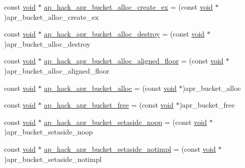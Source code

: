 \begin{DoxyCompactItemize}
\item 
const \hyperlink{group__MOD__ISAPI_gacd6cdbf73df3d9eed42fa493d9b621a6}{void} $\ast$ \hyperlink{srclib_2apr-util_2exports_8c_a69e308992cb68464b97ce9285201ee38}{ap\+\_\+hack\+\_\+apr\+\_\+bucket\+\_\+alloc\+\_\+create\+\_\+ex} = (const \hyperlink{group__MOD__ISAPI_gacd6cdbf73df3d9eed42fa493d9b621a6}{void} $\ast$)apr\+\_\+bucket\+\_\+alloc\+\_\+create\+\_\+ex
\item 
const \hyperlink{group__MOD__ISAPI_gacd6cdbf73df3d9eed42fa493d9b621a6}{void} $\ast$ \hyperlink{srclib_2apr-util_2exports_8c_a544c9332a888f895c9cc1ec7bc718bed}{ap\+\_\+hack\+\_\+apr\+\_\+bucket\+\_\+alloc\+\_\+destroy} = (const \hyperlink{group__MOD__ISAPI_gacd6cdbf73df3d9eed42fa493d9b621a6}{void} $\ast$)apr\+\_\+bucket\+\_\+alloc\+\_\+destroy
\item 
const \hyperlink{group__MOD__ISAPI_gacd6cdbf73df3d9eed42fa493d9b621a6}{void} $\ast$ \hyperlink{srclib_2apr-util_2exports_8c_acd429d9ecb922d0425db1d2fffc8ffc5}{ap\+\_\+hack\+\_\+apr\+\_\+bucket\+\_\+alloc\+\_\+aligned\+\_\+floor} = (const \hyperlink{group__MOD__ISAPI_gacd6cdbf73df3d9eed42fa493d9b621a6}{void} $\ast$)apr\+\_\+bucket\+\_\+alloc\+\_\+aligned\+\_\+floor
\item 
const \hyperlink{group__MOD__ISAPI_gacd6cdbf73df3d9eed42fa493d9b621a6}{void} $\ast$ \hyperlink{srclib_2apr-util_2exports_8c_a0c334b3bc658a01eeded4f403def51b2}{ap\+\_\+hack\+\_\+apr\+\_\+bucket\+\_\+alloc} = (const \hyperlink{group__MOD__ISAPI_gacd6cdbf73df3d9eed42fa493d9b621a6}{void} $\ast$)apr\+\_\+bucket\+\_\+alloc
\item 
const \hyperlink{group__MOD__ISAPI_gacd6cdbf73df3d9eed42fa493d9b621a6}{void} $\ast$ \hyperlink{srclib_2apr-util_2exports_8c_a3bc639753971d2f666713f626a48bfaa}{ap\+\_\+hack\+\_\+apr\+\_\+bucket\+\_\+free} = (const \hyperlink{group__MOD__ISAPI_gacd6cdbf73df3d9eed42fa493d9b621a6}{void} $\ast$)apr\+\_\+bucket\+\_\+free
\item 
const \hyperlink{group__MOD__ISAPI_gacd6cdbf73df3d9eed42fa493d9b621a6}{void} $\ast$ \hyperlink{srclib_2apr-util_2exports_8c_ac7ae8cbcc830ccb1b0250d5a30543dbf}{ap\+\_\+hack\+\_\+apr\+\_\+bucket\+\_\+setaside\+\_\+noop} = (const \hyperlink{group__MOD__ISAPI_gacd6cdbf73df3d9eed42fa493d9b621a6}{void} $\ast$)apr\+\_\+bucket\+\_\+setaside\+\_\+noop
\item 
const \hyperlink{group__MOD__ISAPI_gacd6cdbf73df3d9eed42fa493d9b621a6}{void} $\ast$ \hyperlink{srclib_2apr-util_2exports_8c_ade8f7f5f070cd494f1c3b50bbe5af330}{ap\+\_\+hack\+\_\+apr\+\_\+bucket\+\_\+setaside\+\_\+notimpl} = (const \hyperlink{group__MOD__ISAPI_gacd6cdbf73df3d9eed42fa493d9b621a6}{void} $\ast$)apr\+\_\+bucket\+\_\+setaside\+\_\+notimpl

\end{DoxyCompactItemize}
